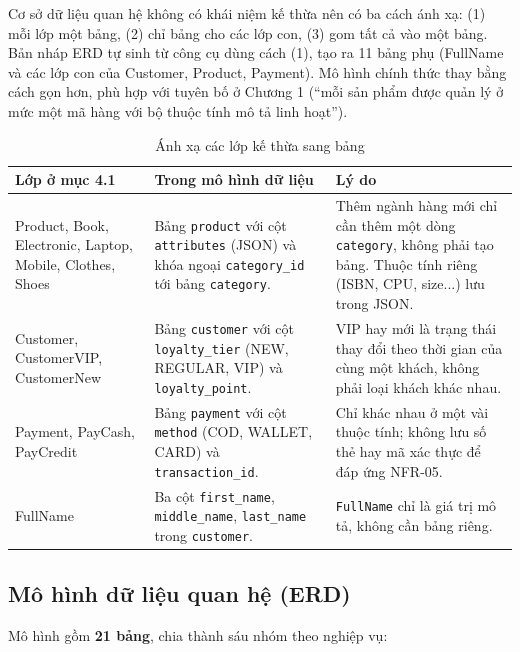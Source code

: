\documentclass[12pt,a4paper,oneside]{report}
\begin{document}
Cơ sở dữ liệu quan hệ không có khái niệm kế thừa nên có ba cách ánh xạ: (1) mỗi lớp một bảng, (2) chỉ bảng cho các lớp con, (3) gom tất cả vào một bảng. Bản nháp ERD tự sinh từ công cụ dùng cách (1), tạo ra 11 bảng phụ (FullName và các lớp con của Customer, Product, Payment). Mô hình chính thức thay bằng cách gọn hơn, phù hợp với tuyên bố ở Chương 1 (``mỗi sản phẩm được quản lý ở mức một mã hàng với bộ thuộc tính mô tả linh hoạt'').

\begin{longtable}{p{3.8cm}p{4.2cm}p{7.8cm}}
\caption{Ánh xạ các lớp kế thừa sang bảng}\\
\toprule
\textbf{Lớp ở mục 4.1} & \textbf{Trong mô hình dữ liệu} & \textbf{Lý do} \\
\midrule
\endhead
\bottomrule
\endlastfoot
Product, Book, Electronic, Laptop, Mobile, Clothes, Shoes & Bảng \texttt{product} với cột \texttt{attributes} (JSON) và khóa ngoại \texttt{category\_id} tới bảng \texttt{category}. & Thêm ngành hàng mới chỉ cần thêm một dòng \texttt{category}, không phải tạo bảng. Thuộc tính riêng (ISBN, CPU, size...) lưu trong JSON. \\
Customer, CustomerVIP, CustomerNew & Bảng \texttt{customer} với cột \texttt{loyalty\_tier} (NEW, REGULAR, VIP) và \texttt{loyalty\_point}. & VIP hay mới là trạng thái thay đổi theo thời gian của cùng một khách, không phải loại khách khác nhau. \\
Payment, PayCash, PayCredit & Bảng \texttt{payment} với cột \texttt{method} (COD, WALLET, CARD) và \texttt{transaction\_id}. & Chỉ khác nhau ở một vài thuộc tính; không lưu số thẻ hay mã xác thực để đáp ứng NFR-05. \\
FullName & Ba cột \texttt{first\_name}, \texttt{middle\_name}, \texttt{last\_name} trong \texttt{customer}. & \texttt{FullName} chỉ là giá trị mô tả, không cần bảng riêng. \\
\end{longtable}

\subsection{Mô hình dữ liệu quan hệ (ERD)}

Mô hình gồm \textbf{21 bảng}, chia thành sáu nhóm theo nghiệp vụ:
\end{document}
